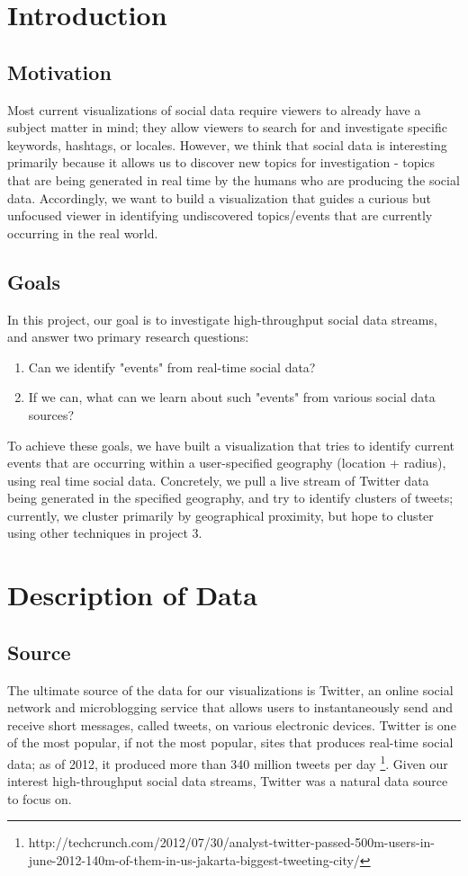 \documentclass[pdftex,12pt,a4paper]{article}
\begin{document}

\tableofcontents
\pagebreak

\section{Introduction}
\subsection{Motivation}
Most current visualizations of social data require viewers to already have a subject matter in mind; they allow viewers to search for and investigate specific keywords, hashtags, or locales. However, we think that social data is interesting primarily because it allows us to discover new topics for investigation - topics that are being generated in real time by the humans who are producing the social data. Accordingly, we want to build a visualization that guides a curious but unfocused viewer in identifying undiscovered topics/events that are currently occurring in the real world.
\subsection{Goals}
In this project, our goal is to investigate high-throughput social data streams, and answer two primary research questions:
\begin{enumerate}
\item Can we identify "events" from real-time social data?
\item If we can, what can we learn about such "events" from various social data sources?
\end{enumerate}
To achieve these goals, we have built a visualization that tries to identify current events that are occurring within a user-specified geography (location + radius), using real time social data. Concretely, we pull a live stream of Twitter data being generated in the specified geography, and try to identify clusters of tweets; currently, we cluster primarily by geographical proximity, but hope to cluster using other techniques in project 3.

\section{Description of Data}
\subsection{Source}
The ultimate source of the data for our visualizations is Twitter, an online social network and microblogging service that allows users to instantaneously send and receive short messages, called tweets, on various electronic devices. Twitter is one of the most popular, if not the most popular, sites that produces real-time social data; as of 2012, it produced more than 340 million tweets per day \footnote{http://techcrunch.com/2012/07/30/analyst-twitter-passed-500m-users-in-june-2012-140m-of-them-in-us-jakarta-biggest-tweeting-city/}. Given our interest high-throughput social data streams, Twitter was a natural data source to focus on.
\end{document}

